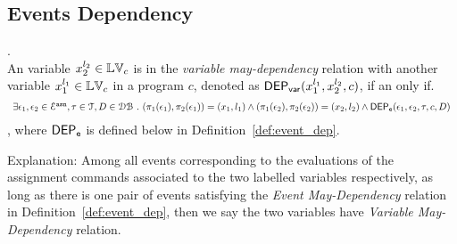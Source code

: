 %
%
%
\subsection{Events Dependency}
%
\begin{defn}.
  \label{def:var_dep}
  \\
  An variable ${x}_2^{l_2} \in \mathbb{LV}_{{c}}$ is in the \emph{variable may-dependency} relation with another
  variable ${x}_1^{l_1} \in \mathbb{LV}_{{c}}$ in a program ${c}$, denoted as 
  $\mathsf{DEP_{var}}({x}_1^{l_1}, {x}_2^{l_2}, {c})$, if an only if.
\[
  \begin{array}{l}
\exists \mathtt{\epsilon}_1, \mathtt{\epsilon}_2 \in \mathcal{E}^{\mathtt{{asn}}}, \mathtt{\tau} \in \mathcal{T} , D \in \mathcal{DB} ~.~
(\pi_{1}{(\mathtt{\epsilon}_1)}, \pi_{2}{(\mathtt{\epsilon}_1)}) = ({x}_1, l_1)
\land
(\pi_{1}{(\mathtt{\epsilon}_2)}, \pi_{2}{(\mathtt{\epsilon}_2)}) = ({x}_2, l_2)
\land 
\mathsf{DEP_{\mathtt{e}}}(\mathtt{\epsilon}_1, \mathtt{\epsilon}_2, \mathtt{\tau}, c, D) 
  \end{array}
\]  %
, where $\mathsf{DEP_{\mathtt{e}}}$ is defined below in Definition~\ref{def:event_dep}.
  \end{defn}
Explanation: 
Among all events corresponding to the evaluations of the assignment commands associated to the two labelled variables respectively, 
as long as there is one pair of events satisfying the \emph{Event May-Dependency} relation in Definition~\ref{def:event_dep}, 
then we say the two variables have \emph{Variable May-Dependency} relation.
